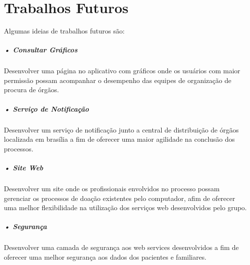 \documentclass[portuguese,oneside]{tcc}
\begin{document}
\section{Trabalhos Futuros}
Algumas ideias de trabalhos futuros são:

\subparagraph{• Consultar Gráficos}
Desenvolver uma página no aplicativo com gráficos onde os usuários com maior permissão possam acompanhar o desempenho das equipes de organização de procura de órgãos.

\subparagraph{• Serviço de Notificação}
Desenvolver um serviço de notificação junto a central de distribuição de órgãos localizada em brasília a fim de oferecer uma maior agilidade na conclusão dos processos.

\subparagraph{• Site Web}
Desenvolver um site onde os profissionais envolvidos no processo possam gerenciar os processos de doação existentes pelo computador, afim de oferecer uma melhor flexibilidade na utilização dos serviços web desenvolvidos pelo grupo.

\subparagraph{• Segurança}
Desenvolver uma camada de segurança aos web services desenvolvidos a fim de oferecer uma melhor segurança aos dados dos pacientes e familiares.









\end{document}
